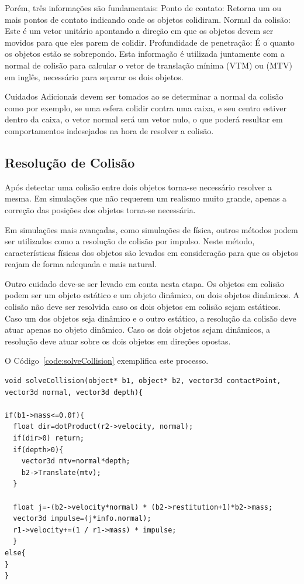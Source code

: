Porém, três informações são fundamentais:
Ponto de contato: Retorna um ou mais pontos de contato indicando onde os objetos colidiram.
Normal da colisão: Este é um vetor unitário apontando a direção em que os objetos devem ser movidos para que eles parem de colidir.
Profundidade de penetração: É o quanto os objetos estão se sobrepondo. Esta
informação é utilizada juntamente com a normal de colisão para calcular o vetor
de translação mínima (VTM) ou (MTV) em inglês, necessário para separar os dois
objetos.

Cuidados Adicionais devem ser tomados ao se determinar a normal da colisão como
por exemplo, se uma esfera colidir contra uma caixa, e seu centro estiver
dentro da caixa, o vetor normal será um vetor nulo, o que poderá resultar em
comportamentos indesejados na hora de resolver a colisão.

\subsection{Resolução de Colisão}

Após detectar uma colisão entre dois objetos torna-se necessário resolver
a mesma. Em simulações que não requerem um realismo muito grande, apenas a
correção das posições dos objetos torna-se necessária.

Em simulações mais avançadas, como simulações de física, outros métodos podem
ser utilizados como a resolução de colisão por impulso.
Neste método, características físicas dos objetos são levados em consideração
para que os objetos reajam de forma adequada e mais natural.

Outro cuidado deve-se ser levado em conta nesta etapa.
Os objetos em colisão podem ser um objeto estático e um objeto dinâmico, ou
dois objetos dinâmicos. A colisão não deve ser resolvida caso os dois objetos
em colisão sejam estáticos.
Caso um dos objetos seja dinâmico e o outro estático, a resolução da colisão
deve atuar apenas no objeto dinâmico.
Caso os dois objetos sejam dinâmicos, a resolução deve atuar sobre os dois
objetos em direções opostas.

O Código~\ref{code:solveCollision} exemplifica este processo.

\begin{lstlisting}[frame=single,caption=Exemplo de resolução de colisão\label{code:solveCollision}]
void solveCollision(object* b1, object* b2, vector3d contactPoint, vector3d normal, vector3d depth){

if(b1->mass<=0.0f){
  float dir=dotProduct(r2->velocity, normal);
  if(dir>0) return;
  if(depth>0){
    vector3d mtv=normal*depth;
    b2->Translate(mtv);
  }

  float j=-(b2->velocity*normal) * (b2->restitution+1)*b2->mass;
  vector3d impulse=(j*info.normal);
  r1->velocity+=(1 / r1->mass) * impulse;
  }
else{
}
}
\end{lstlisting}

